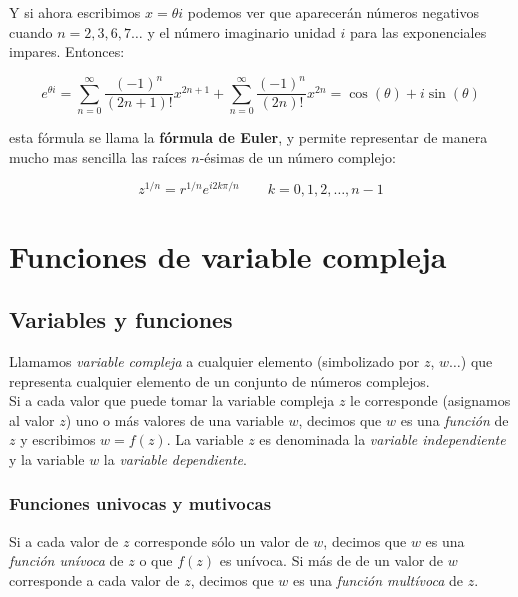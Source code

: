\documentclass[12pt]{book}
\begin{document}
Y si ahora escribimos $x=\theta i$ podemos ver que aparecerán números negativos cuando $n=2,3,6,7 \ldots$ y el número imaginario unidad $i$ para las exponenciales impares. Entonces:

\begin{equation}
e^{\theta i} = \sum_{n=0}^{\infty} \dfrac{(-1)^n}{(2n+1)!} x^{2n+1} + \sum_{n=0}^{\infty} \dfrac{(-1)^n}{(2n)!} x^{2n}  = \cos(\theta) + i \sin  (\theta)
\end{equation} 

esta fórmula se llama la \textbf{fórmula de Euler}, y permite representar de manera mucho mas sencilla las raíces $n$-ésimas de un número complejo:

\begin{equation}
z^{1/n} = r^{1/n} e^{i 2k \pi / n} \quad \quad k = 0,1,2,\ldots,n-1
\end{equation}

\chapter{Funciones de variable compleja}

\section{Variables y funciones}

Llamamos \textit{variable compleja} a cualquier elemento (simbolizado por $z$, $w \ldots$) que representa cualquier elemento de un conjunto de números complejos. \\

Si a cada valor que puede tomar la variable compleja $z$ le corresponde (asignamos al valor $z$) uno o más valores de una variable $w$, decimos que $w$ es una \textit{función} de $z$ y escribimos $w=f(z)$. La variable $z$ es denominada la \textit{variable independiente} y la variable $w$ la \textit{variable dependiente}.

\subsection{Funciones univocas y mutivocas}

Si a cada valor de $z$ corresponde sólo un valor de $w$, decimos que $w$ es una \textit{función unívoca} de $z$ o que $f(z)$ es unívoca. Si más de de un valor de $w$ corresponde a cada valor de $z$, decimos que $w$ es una \textit{función multívoca} de $z$. \\
\end{document}
